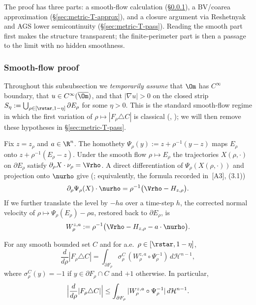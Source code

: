 The proof has three parts: a smooth-flow calculation
(\S\ref{sec:metric-T-smooth}), a BV/coarea approximation
(\S\ref{sec:metric-T-approx}), and a closure argument via Reshetnyak and AGS
lower semicontinuity (\S\ref{sec:metric-T-pass}). Reading the smooth part
first makes the structure transparent; the finite-perimeter part is then a
passage to the limit with no hidden smoothness.

\subsubsection{Smooth-flow proof}
\label{sec:metric-T-smooth}

Throughout this subsubsection we \emph{temporarily assume} that
$\Om$ has $C^\infty$ boundary, that $u\in C^\infty(\overline\Om)$, and that
$|\nabla u|>0$ on the closed strip
$S_\eta:=\bigcup_{\rho\in[\rstar,1-\eta]}\partial E_\rho$ for some $\eta>0$.
This is the standard smooth-flow regime in which the first variation of
$\rho\mapsto|F_\rho\triangle C|$ is classical
(\cite[\S~17.3]{Maggi2012}, \cite[Thm.~3.85]{AFP2000}); we will then remove
these hypotheses in \S\ref{sec:metric-T-pass}.

Fix $z=z_\rho$ and $a\in\R^n$. The homothety
$\Psi_\rho(y):=z+\rho^{-1}(y-z)$ maps $E_\rho$ onto $z+\rho^{-1}(E_\rho-z)$.
Under the smooth flow $\rho\mapsto E_\rho$ the trajectories $X(\rho,\cdot)$ on
$\partial E_\rho$ satisfy $\partial_\rho X\cdot\nu_\rho=\Vrho$. A direct
differentiation of $\Psi_\rho(X(\rho,\cdot))$ and projection onto
$\nurho$ give (\cite[(3.1)]{AmbrosioMantegazza}; equivalently, the formula
recorded in~[A3], (3.1))
\begin{equation}\label{eq:mf-W1}
   \partial_\rho\Psi_\rho(X)\cdot\nurho
      =\rho^{-1}\bigl(\Vrho-H_{z,\rho}\bigr).
\end{equation}
If we further translate the level by $-ha$ over a time-step $h$, the corrected
normal velocity of $\rho\mapsto\Psi_\rho(E_\rho)-\rho a$, restored back to
$\partial E_\rho$, is
\begin{equation}\label{eq:mf-W}
   W^{z,a}_\rho:=\rho^{-1}\bigl(\Vrho-H_{z,\rho}-a\cdot\nurho\bigr).
\end{equation}

\begin{lemma}
\label{lem:mf-FV-smooth}
For any smooth bounded set $C$ and for a.e.~$\rho\in[\rstar,1-\eta]$,
\begin{equation}\label{eq:mf-FV-id}
   \frac{d}{d\rho}|F_\rho\triangle C|
      =\int_{\partial F_\rho}\sigma_\rho^C\,
         (W^{z,a}_\rho\circ\Psi_\rho^{-1})\,d\mathcal H^{n-1},
\end{equation}
where $\sigma_\rho^C(y)=-1$ if $y\in\partial F_\rho\cap C$ and $+1$
otherwise. In particular,
\begin{equation}\label{eq:mf-FV-bd}
   \Bigl|\frac{d}{d\rho}|F_\rho\triangle C|\Bigr|
      \le\int_{\partial F_\rho}|W^{z,a}_\rho\circ\Psi_\rho^{-1}|
         \,d\mathcal H^{n-1}.
\end{equation}
\end{lemma}

